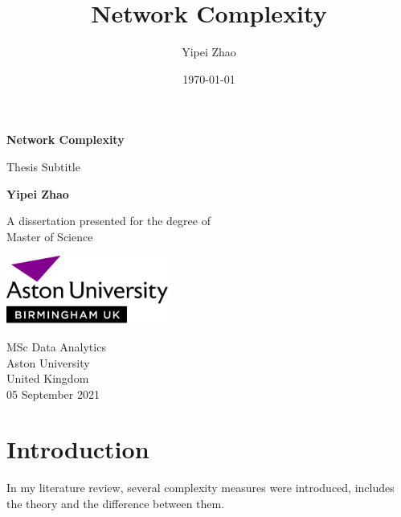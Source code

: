 \documentclass[12pt]{article}
\title{Network Complexity}
\author{Yipei Zhao}
\date{\today}
\begin{document}
\begin{titlepage}
    \begin{center}
        \vspace*{1cm}
            
        \Huge
        \textbf{Network Complexity}
            
        \vspace{0.5cm}
        \LARGE
        Thesis Subtitle
            
        \vspace{1.5cm}
            
        \textbf{Yipei Zhao}
            
        \vfill
            
        A dissertation presented for the degree of\\
        Master of Science
            
        \vspace{0.8cm}
            
        \includegraphics[width=0.4\textwidth]{university.png}
            
        \Large
        MSc Data Analytics\\
        Aston University\\
        United Kingdom\\
        05 September 2021
            
    \end{center}
\end{titlepage}
\tableofcontents
\pagebreak
\section{Introduction}
In my literature review, several complexity measures were introduced, includes the theory and the difference between them. 
\end{document}
